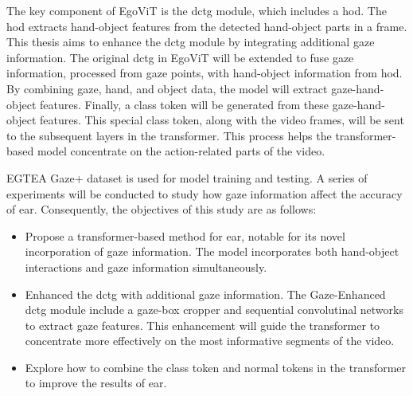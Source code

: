 The key component of EgoViT is the \gls{dctg} module, which includes a \gls{hod}. The \gls{hod} extracts hand-object features from the detected hand-object parts in a frame. This thesis aims to enhance the \gls{dctg} module by integrating additional gaze information. The original \gls{dctg} in EgoViT will be extended to fuse gaze information, processed from gaze points, with hand-object information from \gls{hod}. By combining gaze, hand, and object data, the model will extract gaze-hand-object features. Finally, a class token will be generated from these gaze-hand-object features. This special class token, along with the video frames, will be sent to the subsequent layers in the transformer. This process helps the transformer-based model concentrate on the action-related parts of the video.

EGTEA Gaze+ dataset is used for model training and testing. A series of experiments will be conducted to study how gaze information affect the accuracy of \gls{ear}. Consequently, the objectives of this study are as follows:
\begin{itemize}
    \item Propose a transformer-based method for \gls{ear}, notable for its novel incorporation of gaze information. The model incorporates both hand-object interactions and gaze information simultaneously.
    \item Enhanced the \gls{dctg} with additional gaze information. The Gaze-Enhanced \gls{dctg} module include a gaze-box cropper and sequential convolutinal networks to extract gaze features. This enhancement will guide the transformer to concentrate more effectively on the most informative segments of the video.
    \item Explore how to combine the class token and normal tokens in the transformer to improve the results of \gls{ear}.
\end{itemize}



\clearpage
